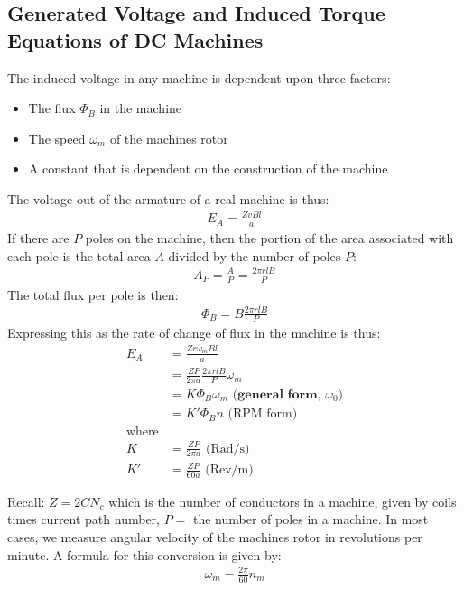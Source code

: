 \documentclass{book}
\begin{document}
\subsection{Generated Voltage and Induced Torque Equations of DC Machines}

The induced voltage in any machine is dependent upon three factors:
\begin{itemize}
	\item The flux $\Phi_B$ in the machine
	\item The speed $\omega_m$ of the machines rotor
	\item A constant that is dependent on the construction of the machine
\end{itemize}

The voltage out of the armature of a real machine is thus:
\begin{align*}
	E_A = \frac{ZvBl}{a}
\end{align*}
If there are $P$ poles on the machine, then the portion of the area associated with each pole is the total area $A$ divided by the number of poles $P$:
\begin{align*}
	A_P = \frac{A}{P} = \frac{2\pi r l B}{P} 
\end{align*}
The total flux per pole is then:
\begin{align*}
	\Phi_B = B \frac{2 \pi r l B}{P} 
\end{align*}
Expressing this as the rate of change of flux in the machine is thus:
\begin{align*}
	E_A &= \frac{Z r \omega_m Bl}{a} \\
	&= \frac{ZP}{2 \pi a} \frac{2\pi r l B}{P} \omega_m \\
	&= K \Phi_B \omega_m  \textbf{ (general form, $\omega_0$)}\\
	&= K' \Phi_B n \text{ (RPM form)} \\
	\text{where}& \\
	K &= \frac{ZP}{2\pi a} \text{ (Rad/s)} \\
	K' &=  \frac{ZP}{60 a} \text{ (Rev/m)} 
\end{align*}

Recall: $Z = 2C N_c$ which is the number of conductors in a machine, given by coils times  current path number, $P =$ the number of poles in a machine. In most cases, we measure angular velocity of the machines rotor in revolutions per minute. A formula for this conversion is given by:
\begin{align*}
	\omega_m = \frac{2\pi}{60}n_m
\end{align*}
\end{document}
